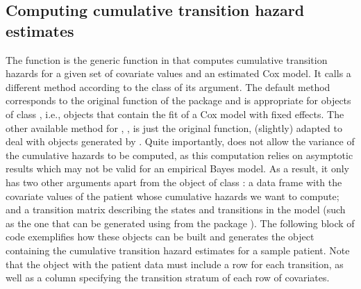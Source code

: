 \subsection{Computing cumulative transition hazard estimates}
\label{sec:computing_cumulative_hazards}
The function  is the generic function in  that computes cumulative transition hazards for a given set of covariate values and an estimated Cox model.  It calls a different method according to the class of its  argument. The default method corresponds to the original  function of the  package and is appropriate for objects of class , i.e., objects that contain the fit of a Cox model with fixed effects. The other available method for , , is just the original  function, (slightly) adapted to deal with objects generated by . 
Quite importantly,   does not allow the variance of the cumulative hazards to be computed, as this computation relies on asymptotic results which may not be valid for an empirical Bayes model. As a result, it only has two other arguments apart from the object of class : a data frame with the covariate values of the patient whose cumulative hazards we want to compute; and a transition matrix describing the states and transitions in the model (such as the one that can be generated using  from the package ). 
The following block of code exemplifies how these objects can be built and generates the  object containing the cumulative transition hazard estimates for a sample patient. Note that the object with the patient data must include a row for each transition, as well as a column specifying the transition stratum of each row of covariates.


